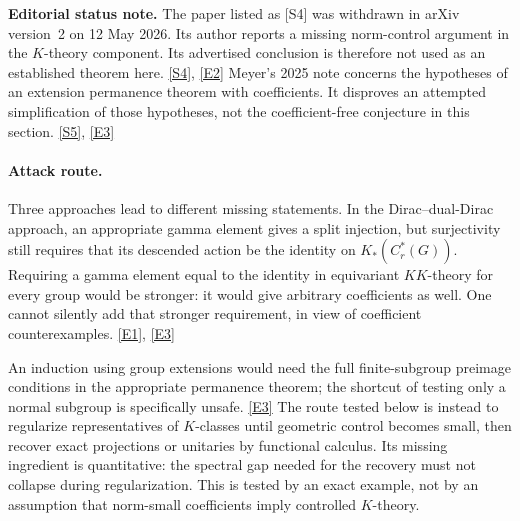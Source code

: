 \documentclass[11pt]{article}
\newcommand{\sref}[2]{\hyperlink{source:#1:#2}{[S#2]}}
\newcommand{\eref}[2]{\hyperlink{extra:#1:#2}{[E#2]}}
\begin{document}
\textbf{Editorial status note.} The paper listed as [S4] was withdrawn
in arXiv version~2 on 12 May 2026. Its author reports a missing norm-control
argument in the $K$-theory component. Its advertised conclusion is
therefore not used as an established theorem here. \sref{1479}{4},
\eref{1479}{2}
Meyer's 2025 note concerns the hypotheses of an extension permanence
theorem with coefficients. It disproves an attempted simplification of
those hypotheses, not the coefficient-free conjecture in this section.
\sref{1479}{5}, \eref{1479}{3}

\paragraph{Attack route.}
Three approaches lead to different missing statements. In the
Dirac--dual-Dirac approach, an appropriate gamma element gives a split
injection, but surjectivity still requires that its descended action be
the identity on $K_*(C_r^*(G))$. Requiring a gamma element equal to the
identity in equivariant $KK$-theory for every group would be stronger:
it would give arbitrary coefficients as well. One cannot silently add
that stronger requirement, in view of coefficient counterexamples.
\eref{1479}{1}, \eref{1479}{3}

An induction using group extensions would need the full finite-subgroup
preimage conditions in the appropriate permanence theorem; the shortcut
of testing only a normal subgroup is specifically unsafe. \eref{1479}{3}
The route tested below is instead to regularize representatives of
$K$-classes until geometric control becomes small, then recover exact
projections or unitaries by functional calculus. Its missing ingredient
is quantitative: the spectral gap needed for the recovery must not
collapse during regularization. This is tested by an exact example, not
by an assumption that norm-small coefficients imply controlled
$K$-theory.
\end{document}
